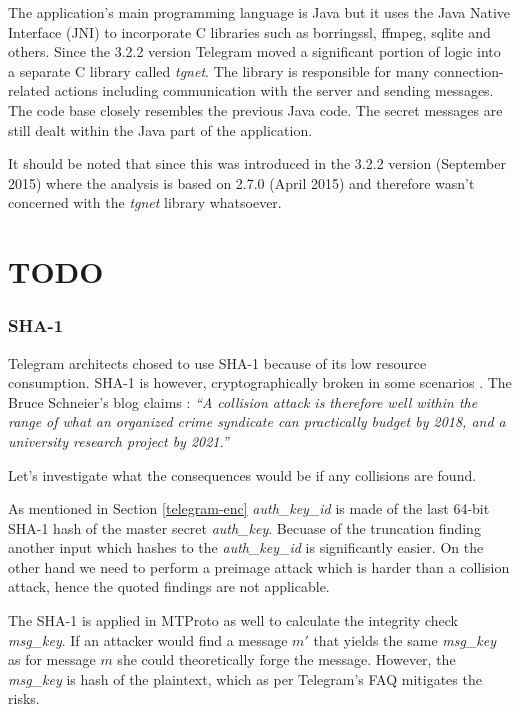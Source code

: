 \documentclass[thesis=M,english]{FITthesis}[2012/10/20]
\begin{document}
The application's main programming language is Java but it uses the Java Native Interface (JNI) to incorporate C libraries such as borringssl, ffmpeg, sqlite and others. Since the 3.2.2 version Telegram moved a significant portion of logic into a separate C library called \emph{tgnet}. The library is responsible for many connection-related actions including communication with the server and sending messages. The code base closely resembles the previous Java code. The secret messages are still dealt within the Java part of the application.

It should be noted that since this was introduced in the 3.2.2 version (September 2015) where the \cite{telegram-aarhus} analysis is based on 2.7.0 (April 2015) and therefore wasn't concerned with the \emph{tgnet} library whatsoever.



\chapter{TODO}

\subsection{SHA-1}

Telegram architects chosed to use SHA-1 because of its low resource consumption. SHA-1 is however, cryptographically broken in some scenarios \cite{telegram-sha1}. The Bruce Schneier's blog claims \cite{telegram-sha1}: \emph{``A collision attack is therefore well within the range of what an organized crime syndicate can practically budget by 2018, and a university research project by 2021.''}

Let's investigate what the consequences would be if any collisions are found.

As mentioned in Section \ref{telegram-enc} \emph{auth\_key\_id} is made of the last 64-bit SHA-1 hash of the master secret \emph{auth\_key}. Becuase of the truncation finding another input which hashes to the \emph{auth\_key\_id} is significantly easier. On the other hand we need to perform a preimage attack which is harder than a collision attack, hence the quoted findings are not applicable.

The SHA-1 is applied in MTProto as well to calculate the integrity check \emph{msg\_key}. If an attacker would find a message $m'$ that yields the same \emph{msg\_key} as for message $m$ she could theoretically forge the message. However, the \emph{msg\_key} is hash of the plaintext, which as per Telegram's FAQ \cite{telegram-techfaq} mitigates the risks.
\end{document}
